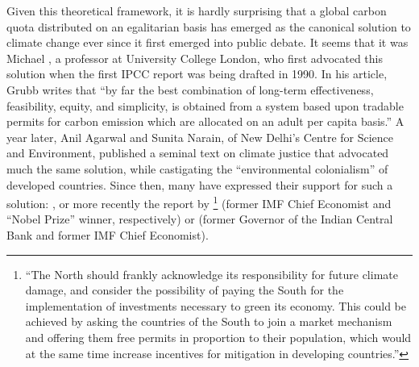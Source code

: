 \documentclass[a5paper,english,openany]{memoir}
\begin{document}
Given this theoretical framework, it is hardly surprising that a global carbon quota distributed on an egalitarian basis has emerged as the canonical solution to climate change ever since it first emerged into public debate. It seems that it was Michael \citet{grubb_greenhouse_1990}, a professor at University College London, who first advocated this solution when the first IPCC report was being drafted in 1990. In his article, Grubb writes that ``by far the best combination of long-term effectiveness, feasibility, equity, and simplicity, is obtained from a system based upon tradable permits for carbon emission which are allocated on an adult per capita basis.'' A year later, Anil Agarwal and Sunita Narain, of New Delhi's Centre for Science and Environment, published a seminal text on climate justice that advocated much the same solution, while castigating the ``environmental colonialism'' of developed countries. %
Since then, many have expressed their support for such a solution: \citet{bertram_tradeable_1992,baer_equity_2000,jamieson_climate_2001}, or more recently the report by \citet{blanchard_major_2021}\footnote{``The North should
frankly acknowledge its responsibility for future climate damage, and
consider the possibility of paying the South for the implementation of investments
necessary to green its economy. This could be achieved by asking the countries of the South to join a %
market mechanism and offering them free permits in proportion to their population, which would at the same time increase incentives for mitigation in developing countries.''} (former IMF Chief Economist and ``Nobel Prize'' winner, respectively) or \citet{rajan_global_2021} (former Governor of the Indian Central Bank and former IMF Chief Economist). 
\end{document}
